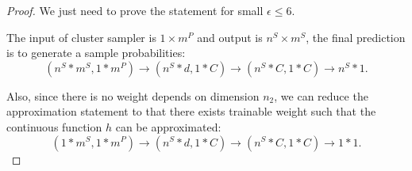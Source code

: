 \begin{proof}
    We just need to prove the statement for small $\epsilon \leq 6$.

    The input of cluster sampler is $1 \times m^P$ and output is $n^S \times m^S$, the final prediction is to generate a sample probabilities:
    \begin{equation}
        (n^S * m^S, 1 * m^P) \to (n^S * d, 1 * C) \to (n^S * C, 1 * C) \to n^S * 1. 
    \end{equation}

    Also, since there is no weight depends on dimension $n_2$, we can reduce the approximation statement to that there exists trainable weight such that the continuous function $h$ can be approximated:
    \begin{equation}
        (1 * m^S, 1 * m^P) \to (n^S * d, 1 * C) \to (n^S * C, 1 * C) \to 1 * 1. 
    \end{equation}


\end{proof}

